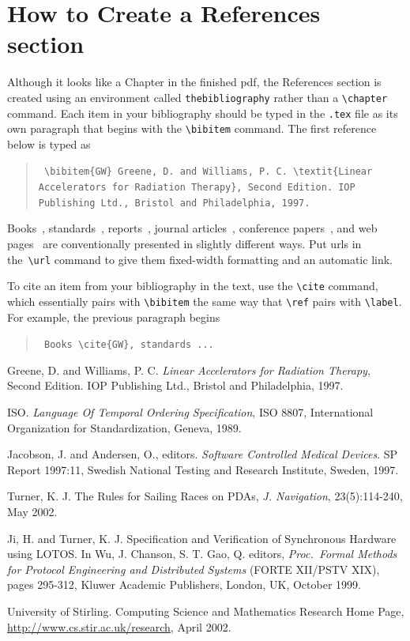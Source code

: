 \documentclass[11pt]{report}
\newcommand{\cmd}[1]{\texttt{\textbackslash{}#1}}
\newcommand{\unnumberedchapter}[1]{\chapter*{#1}\addcontentsline{toc}{chapter}{#1}}
\begin{document}
\unnumberedchapter{How to Create a References section}

Although it looks like a Chapter in the finished pdf, the References section is created using an environment called \texttt{thebibliography} rather than a \cmd{chapter} command. Each item in your bibliography should be typed in the \texttt{.tex} file as its own paragraph that begins with the \cmd{bibitem} command. The first reference below is typed as
\begin{quote}\tt
	\textbackslash{}bibitem\{GW\} Greene, D. and Williams, P. C. \textbackslash{}textit\{Linear Accelerators for Radiation Therapy\}, Second Edition. IOP Publishing Ltd., Bristol and Philadelphia, 1997.
\end{quote}
Books~\cite{GW}, standards~\cite{ISO}, reports~\cite{JA}, journal articles~\cite{Turner}, conference papers~\cite{JT}, and web pages~\cite{Stirling} are conventionally presented in slightly different ways. Put urls in the~\cmd{url} command to give them fixed-width formatting and an automatic link.

To cite an item from your bibliography in the text, use the \cmd{cite} command, which essentially pairs with \cmd{bibitem} the same way that \cmd{ref} pairs with \cmd{label}. For example, the previous paragraph begins
\begin{quote}\tt
	Books \textbackslash{}cite\{GW\}, standards ...
\end{quote}

\begin{thebibliography}{99999}

 Greene, D. and Williams, P. C. \textit{Linear Accelerators for Radiation Therapy}, Second Edition. IOP Publishing Ltd., Bristol and Philadelphia, 1997.

 ISO. \textit{Language Of Temporal Ordering Specification}, ISO 8807, International Organization for Standardization, Geneva, 1989.

 Jacobson, J. and Andersen, O., editors. \textit{Software Controlled Medical Devices}. SP Report 1997:11, Swedish National Testing and Research Institute, Sweden, 1997.

 Turner, K. J. The Rules for Sailing Races on PDAs, \textit{J. Navigation}, 23(5):114-240, May 2002.

 Ji, H. and Turner, K. J. Specification and Verification of Synchronous Hardware using LOTOS. In Wu, J. Chanson, S. T. Gao, Q. editors, \textit{Proc.~Formal Methods for Protocol Engineering and Distributed Systems} (FORTE XII/PSTV XIX), pages 295-312, Kluwer Academic Publishers, London, UK, October 1999.

 University of Stirling. Computing Science and Mathematics Research Home Page, \url{http://www.cs.stir.ac.uk/research}, April 2002.

\end{thebibliography}
\end{document}

